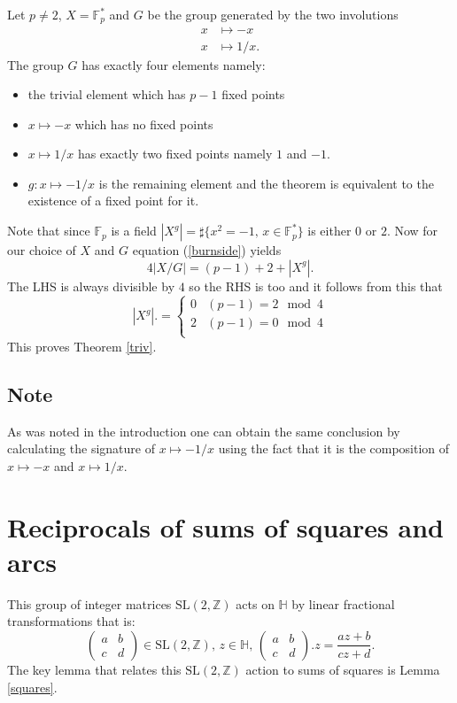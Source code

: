 \documentclass[12pt,a4paper]{amsart}
\def\HH{\mathbb{H}}
\def\ZZ{\mathbb{Z}}
\def\fp{\mathbb{F}_p}
\def\sl2{\mathrm{SL}(2, \ZZ)}
\begin{document}
Let $p \neq 2$,  $X = \fp^*$ and $G$ be the group generated by the two involutions
\begin{eqnarray*}
x & \mapsto -x \\
x & \mapsto 1/x.
\end{eqnarray*}
The group  $G$ has exactly four elements namely:
\begin{itemize}
\item the trivial element which has  $p-1$ fixed points
\item $x\mapsto -x$ which has no fixed points 
\item  $x\mapsto 1/x$ has exactly two fixed points namely $1$ and $-1$.
\item  $g:x \mapsto -1/x$ is the remaining element and the theorem is equivalent to the existence of a fixed point for it.
\end{itemize}
Note that since $\fp$ is a field 
$|X^g| = \sharp \{x^2 = -1, \, x\in \fp^* \}$
is either $0$ or $2$.
Now for our choice of $X$ and $G$ equation (\ref{burnside}) yields
\begin{equation}
4 |X/G|   = (p-1) + 2 + |X^g|.
\end{equation}  
The LHS is always divisible by $4$ so the  RHS is too and
it follows from this that
$$ |X^g|. = \left\{  \begin{array}{ll}
0 & (p-1) =  2 \mod 4 \\
2 & (p-1) =  0 \mod 4 \\
\end{array}
\right.
$$
This proves Theorem \ref{triv}.

\subsection*{Note}
As was noted in the introduction one can obtain the same conclusion 
by calculating the signature of $x\mapsto -1/x$ 
using the fact that it is  the composition of
$x \mapsto -x$ and $x \mapsto 1/x$.


\section{Reciprocals of sums of squares and arcs}

This group of integer matrices $\sl2$  acts on $\HH$ by linear fractional transformations
that is:
$$\begin{pmatrix}
a & b \\
c & d
\end{pmatrix} \in \sl2,\, z\in \HH,\, 
\begin{pmatrix}
a & b \\
c & d
\end{pmatrix}. z = \frac{az + b}{cz + d}.
$$
The key lemma that relates this  $\sl2$ action to sums of squares is Lemma \ref{squares}.
\end{document}
